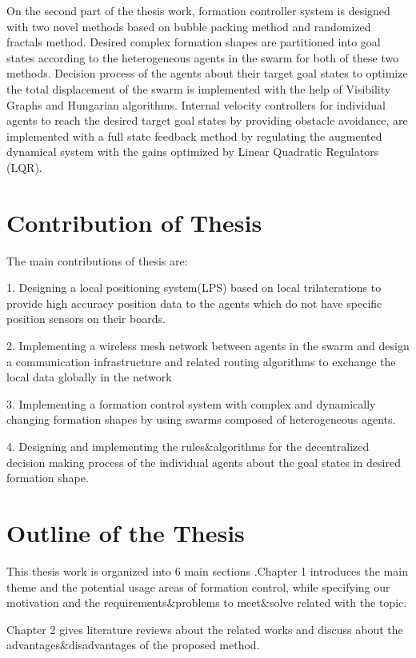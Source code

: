 On the second part of the thesis work, formation controller system is designed with two novel methods based on bubble packing method and randomized fractals method. Desired complex formation shapes are partitioned into goal states according to the heterogeneous agents in the swarm for both of these two methods. Decision process of the agents about their target goal states to optimize the total displacement of the swarm is implemented with the help of Visibility Graphs and Hungarian algorithms. Internal velocity controllers for individual agents to reach the desired target goal states by providing obstacle avoidance, are implemented with a full state feedback method by regulating the augmented dynamical system with the gains optimized by Linear Quadratic Regulators (LQR).

\section{Contribution of Thesis}
The main contributions of thesis are:

1. Designing a local positioning system(LPS) based on local trilaterations to provide high accuracy position data to the agents which do not have specific position sensors on their boards.

2. Implementing a wireless mesh network between agents in the swarm and design a communication infrastructure and related routing algorithms to exchange the local data globally in the network

3. Implementing a formation control system with complex and dynamically changing formation shapes by using swarms composed of heterogeneous agents.

4. Designing and implementing the rules$\&$algorithms for the decentralized decision making process of the individual agents about the goal states in desired formation shape.


\section{Outline of the Thesis}
This thesis work is organized into 6 main sections .Chapter 1 introduces the main theme and the potential usage areas of formation control, while specifying our motivation and the requirements$\&$problems to meet$\&$solve related with the topic.

Chapter 2 gives literature reviews about the related works and discuss about the advantages$\&$disadvantages of the proposed method.


